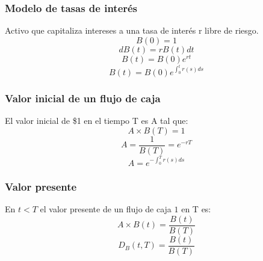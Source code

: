 \begin{frame}
    \frametitle{Modelo de tasas de interés}
    \begin{defin}
        Activo que capitaliza intereses a una tasa de interés r libre de riesgo.\\
        \begin{equation*}
            B(0) = 1 
        \end{equation*}
        \begin{equation*}
            dB(t) = rB(t)dt
        \end{equation*}
        \begin{equation*}
            B(t) = B(0)e^{rt}
        \end{equation*}
        \begin{equation*}
            B(t) = B(0)e^{\int_0^t r(s)ds}
        \end{equation*}
    \end{defin}
\end{frame}


\begin{frame}
    \frametitle{Valor inicial de un flujo de caja}
    \begin{defin}
        El valor inicial de \$1 en el tiempo T es A tal que:
        \begin{equation*}
            A \times B(T) = 1
        \end{equation*}
        \begin{equation*}
            A = \frac{1}{B(T)} = e^{-rT}
        \end{equation*}
        \begin{equation*}
            A = e^{-\int_0^T r(s)ds}
        \end{equation*}
    \end{defin}
\end{frame}

\begin{frame}
    \frametitle{Valor presente}
    \begin{defin}
        En $t<T$ el valor presente de un flujo de caja $1$ en T es:
        \begin{equation*}
            A \times B(t) = \frac{B(t)}{B(T)}
        \end{equation*}
        \begin{equation*}
           D_B(t,T) = \frac{B(t)}{B(T)}
        \end{equation*}
    \end{defin}
\end{frame}

